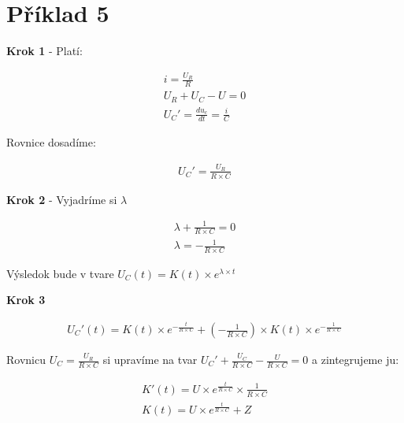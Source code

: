 \section{Příklad 5}

\begin{center}
\textbf{Krok 1} - Platí:
\end{center}

\begin{gather*}
i = \frac{U_{R}}{R}\\
U_{R} + U_{C} - U = 0\\
U_{C}' = \frac{du_{c}}{dt}=\frac{i}{C}
\end{gather*}

\begin{center}
Rovnice dosadíme:
\end{center}

\begin{gather*}
U_{C}' = \frac{U_{R}}{R \times C}
\end{gather*}

\begin{center}
\textbf{Krok 2} - Vyjadríme si $\lambda $
\end{center}

\begin{gather*}
\lambda + \frac{1}{R \times C} = 0\\
\lambda = -\frac{1}{R \times C}
\end{gather*}

\begin{center}
Výsledok bude v tvare $U_{C}(t) = K(t) \times e^{\lambda \times t}$
\end{center}

\begin{center}
\textbf{Krok 3}
\end{center}

\begin{gather*}
U_{C}'(t) = K(t) \times e^{-\frac{t}{R \times C}} + (-\frac{1}{R \times C}) \times K(t) \times e^{-\frac{1}{R \times C}}
\end{gather*}

\begin{center}
Rovnicu $U_{C} = \frac{U_{R}}{R \times C}$ si upravíme na tvar $U_{C}' + \frac{U_{C}}{R \times C} -  \frac{U}{R \times C} = 0$ a zintegrujeme ju:
\end{center}

\begin{gather*}
K'(t) = U \times e^{\frac{t}{R \times C}} \times \frac{1}{R \times C}\\
K(t) = U \times e^{\frac{t}{R \times C}} + Z\\
\end{gather*}


